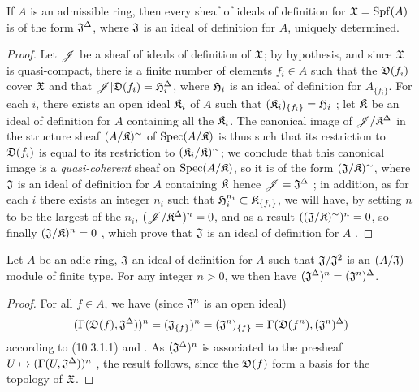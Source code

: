 \begin{prop}[10.3.5]
\label{1.10.3.5}
If $A$ is an admissible ring, then every sheaf of ideals of definition for $\mathfrak{X}={\mathop{\mathrm{Spf}}\nolimits}(A)$ is of the form $\mathfrak{J}^\Delta$, where $\mathfrak{J}$ is an ideal of definition for $A$, uniquely determined.
\end{prop}

\begin{proof}
\label{proof-1.10.3.5}
Let $\mathscr{J}$ be a sheaf of ideals of definition of $\mathfrak{X}$; by hypothesis, and since $\mathfrak{X}$ is quasi-compact, there is a finite number of elements $f_i\in A$ such that the $\mathfrak{D}(f_i)$ cover $\mathfrak{X}$ and that $\mathscr{J}|\mathfrak{D}(f_i)=\mathfrak{H}_i^\Delta$, where $\mathfrak{H}_i$ is an ideal of definition for $A_{\{f_i\}}$.
For each $i$, there exists an open ideal $\mathfrak{K}_i$ of $A$ such that $(\mathfrak{K}_i)_{\{f_i\}}=\mathfrak{H}_i$ ; let $\mathfrak{K}$ be an ideal of definition for $A$ containing all the $\mathfrak{K}_i$.
The canonical image of $\mathscr{J}/\mathfrak{K}^\Delta$ in the structure sheaf $(A/\mathfrak{K})^\sim$ of ${\mathop{\mathrm{Spec}}\nolimits}(A/\mathfrak{K})$  is thus such that its restriction to $\mathfrak{D}(f_i)$ is equal to its restriction to $(\mathfrak{K}_i/\mathfrak{K})^\sim$;
we conclude that this canonical image is a \emph{quasi-coherent} sheaf on ${\mathop{\mathrm{Spec}}\nolimits}(A/\mathfrak{K})$, so it is of the form $(\mathfrak{J}/\mathfrak{K})^\sim$, where $\mathfrak{J}$ is an ideal of definition for $A$ containing $\mathfrak{K}$  hence $\mathscr{J}=\mathfrak{J}^\Delta$ ;
in addition, as for each $i$ there exists an integer $n_i$ such that $\mathfrak{H}_i^{n_i}\subset\mathfrak{K}_{\{f_i\}}$, we will have, by setting $n$ to be the largest of the $n_i$, $(\mathscr{J}/\mathfrak{K}^\Delta)^n=0$, and as a result  $((\mathfrak{J}/\mathfrak{K})^\sim)^n=0$, so finally $(\mathfrak{J}/\mathfrak{K})^n=0$ , which prove that $\mathfrak{J}$ is an ideal of definition for $A$ .
\end{proof}

\begin{prop}[10.3.6]
\label{1.10.3.6}
Let $A$ be an adic ring, $\mathfrak{J}$ an ideal of definition for $A$ such that $\mathfrak{J}/\mathfrak{J}^2$ is an $(A/\mathfrak{J})$-module of finite type. For any integer $n>0$, we then have $(\mathfrak{J}^\Delta)^n=(\mathfrak{J}^n)^\Delta$.
\end{prop}

\begin{proof}
\label{proof-1.10.3.6}
For all $f\in A$, we have (since $\mathfrak{J}^n$ is an open ideal)
\[
  (\Gamma(\mathfrak{D}(f),\mathfrak{J}^\Delta))^n=(\mathfrak{J}_{\{f\}})^n=(\mathfrak{J}^n)_{\{f\}}=\Gamma(\mathfrak{D}(f^n),(\mathfrak{J}^n)^\Delta)
\]
according to (10.3.1.1) and .
As $(\mathfrak{J}^\Delta)^n$ is associated to the presheaf $U\mapsto(\Gamma(U,\fk{J}^\Delta))^n$ , the result follows, since the $\mathfrak{D}(f)$ form a basis for the topology of $\mathfrak{X}$.
\end{proof}

